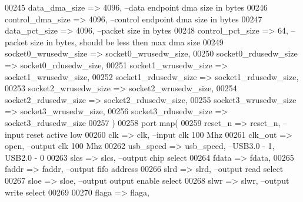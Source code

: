 \begin{DoxyCode}
00245                 data_dma_size           => \textcolor{vhdllogic}{4096},\textcolor{keyword}{                            --data endpoint dma size in
       bytes}
00246                 control_dma_size        => \textcolor{vhdllogic}{4096},\textcolor{keyword}{                            --control endpoint dma size in
       bytes}
00247                 data_pct_size           => \textcolor{vhdllogic}{4096},\textcolor{keyword}{                            --packet size in bytes}
00248                 control_pct_size        => \textcolor{vhdllogic}{64},\textcolor{keyword}{                          --packet size in bytes, should be
       less then max dma size}
00249                 socket0_wrusedw_size => socket0_wrusedw_size,
00250                 socket0_rdusedw_size    => socket0_rdusedw_size,
00251                 socket1_wrusedw_size => socket1_wrusedw_size,
00252                 socket1_rdusedw_size    => socket1_rdusedw_size,
00253                 socket2_wrusedw_size => socket2_wrusedw_size,
00254                 socket2_rdusedw_size    => socket2_rdusedw_size,
00255                 socket3_wrusedw_size => socket3_wrusedw_size,
00256                 socket3_rdusedw_size    => socket3_rdusedw_size
00257                 \textcolor{vhdlchar}{)}
00258     \textcolor{keywordflow}{port} \textcolor{keywordflow}{map}(
00259         reset_n                     => reset_n,\textcolor{keyword}{                             --input reset active low}
00260         clk                 => clk,\textcolor{keyword}{                                     --input clk 100 Mhz  }
00261         clk_out             => \textcolor{keywordflow}{open},\textcolor{keyword}{                                --output clk 100 Mhz }
00262         usb_speed               => usb_speed,\textcolor{keyword}{                           --USB3.0 - 1, USB2.0 - 0}
00263         slcs                    => slcs,\textcolor{keyword}{                                    --output chip select}
00264         fdata                   => fdata,         
00265         faddr                   => faddr,\textcolor{keyword}{                               --output fifo address}
00266         slrd                    => slrd,\textcolor{keyword}{                                --output read select}
00267         sloe                    => sloe,\textcolor{keyword}{                                    --output output enable select}
00268         slwr                    => slwr,\textcolor{keyword}{                                    --output write select}
00269                     
00270       flaga                 => flaga,                               

\end{DoxyCode}
